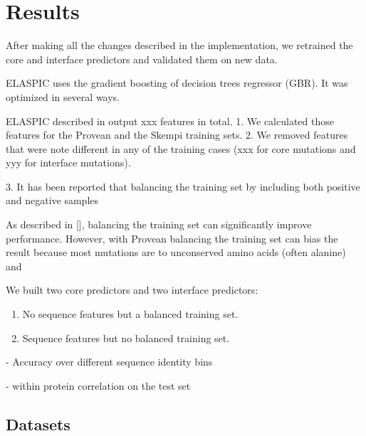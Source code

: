 
\chapter{Results} \label{chap:results}

After making all the changes described in the implementation, we retrained the core and interface predictors and validated them on new data.


ELASPIC uses the gradient boosting of decision trees regressor (GBR). It was optimized in several ways.

ELASPIC described in  output xxx features in total.
1. We calculated those features for the Provean and the Skempi training sets.
2. We removed features that were note different in any of the training cases (xxx for core mutations and yyy for interface mutations).

3. It has been reported that balancing the training set by including both positive and negative samples


As described in [], balancing the training set can significantly improve performance. However, with Provean balancing the training set can bias the result because most mutations are to unconserved amino acids (often alanine) and



We built two core predictors and two interface predictors:

\begin{enumerate}
	\item No sequence features but a balanced training set.
	\item Sequence features but no balanced training set.
\end{enumerate}

- Accuracy over different sequence identity bins

- within protein correlation on the test set



\section{Datasets}

